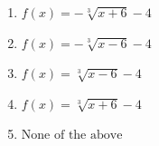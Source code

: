 \documentclass[14pt]{extbook}
\begin{document}
\begin{enumerate}
{\begin{center}
\end{center}
\begin{enumerate}[label=\Alph*.]
\item \( f(x) = - \sqrt[3]{x + 6} - 4 \)
\item \( f(x) = - \sqrt[3]{x - 6} - 4 \)
\item \( f(x) = \sqrt[3]{x - 6} - 4 \)
\item \( f(x) = \sqrt[3]{x + 6} - 4 \)
\item \( \text{None of the above} \)

\end{enumerate} }
\end{enumerate}
\end{document}
